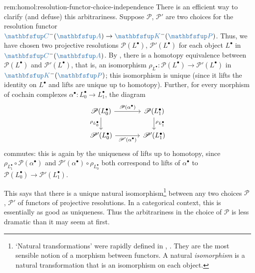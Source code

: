 \begin{rem}{}{rem:homol:resolution-functor-choice-independence}
  There is an efficient way to clarify (and defuse) this
  arbitrariness. Suppose $\mathscr{P}$, $\mathscr{P}'$ are two choices
  for the resolution functor
  $\categ{C}^-(\categ{A}) \to \categ{K}^-(\categ{P})$. Thus, we have
  chosen two projective resolutions $\mathscr{P}(L^\bullet)$,
  $\mathscr{P}'(L^\bullet)$ for each object $L^\bullet$ in
  $\categ{C}^-(\categ{A})$. By , there is a
  homotopy equivalence between $\mathscr{P}(L^\bullet)$ and
  $\mathscr{P}'(L^\bullet)$, that is, an isomorphism
  $\rho_{L^\bullet} : \mathscr{P}(L^\bullet) \to
  \mathscr{P}'(L^\bullet)$ in $\categ{K}^-(\categ{P})$; this
  isomorphism is unique (since it lifts the identity on $L^\bullet$
  and lifts are unique up to homotopy). Further, for every morphism of
  cochain complexes $\alpha^\bullet : L_0^\bullet \to L_1^\bullet$,
  the diagram
  \[\begin{tikzcd}[column sep=large]
      \mathscr{P}(L_0^\bullet) \arrow[r,
      "\mathscr{P}(\alpha^\bullet)"] \arrow[d, "\rho_{L_0^\bullet}"']
      &
      \mathscr{P}(L_1^\bullet) \arrow[d, "\rho_{L_1^\bullet}"] \\
      \mathscr{P}'(L_0^\bullet) \arrow[r,
      "\mathscr{P}'(\alpha^\bullet)"'] & \mathscr{P}'(L_1^\bullet)
    \end{tikzcd}\] commutes: this is again by the uniqueness of lifts
  up to homotopy, since
  $\rho_{L_1^\bullet} \circ \mathscr{P}(\alpha^\bullet)$ and
  $\mathscr{P}'(\alpha^\bullet) \circ \rho_{L_0^\bullet}$ both
  correspond to lifts of $\alpha^\bullet$ to
  $\mathscr{P}(L_0^\bullet) \to \mathscr{P}'(L_1^\bullet)$.

  This says that there is a unique natural
  isomorphism\footnote{`Natural transformations' were rapidly defined
    in ,
    . They are the most sensible notion of a
    morphism between functors. A natural \emph{isomorphism} is a
    natural transformation that is an isomorphism on each object.}
  between any two choices $\mathscr{P}$, $\mathscr{P}'$ of functors of
  projective resolutions. In a categorical context, this is
  essentially as good as uniqueness.  Thus the arbitrariness in the
  choice of $\mathscr{P}$ is less dramatic than it may seem at first.
\end{rem}

